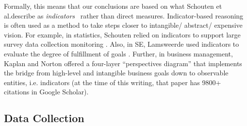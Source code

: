 \documentclass[sigconf,review,anonymous]{acmart}
\begin{document}
Formally, this means that our conclusions are based on what
Schouten et al.describe as
 {\em indicators}~\cite{schouten2010indicators} rather than direct measures. Indicator-based reasoning is often used as a method to take steps closer to intangible/ abstract/ expensive vision. For example,
 in statistics, Schouten relied on indicators to support large survey data collection monitoring \cite{schouten2010indicators}. Also, in SE, Lamsweerde used indicators to evaluate the degree of fulfillment of goals \cite{vanLamsweerde2009_requirement}.
 Further, in business 
 management, Kaplan and Norton \cite{kaplan1996using} offered a four-layer ``perspectives diagram'' that implements the bridge from high-level and intangible business goals down
 to observable entities, i.e. indicators (at the time of this
 writing, that paper has  9800+ citations in Google Scholar).
   


 

 
 
\newpage \subsection{Data Collection}\label{tion:data}
\end{document}
